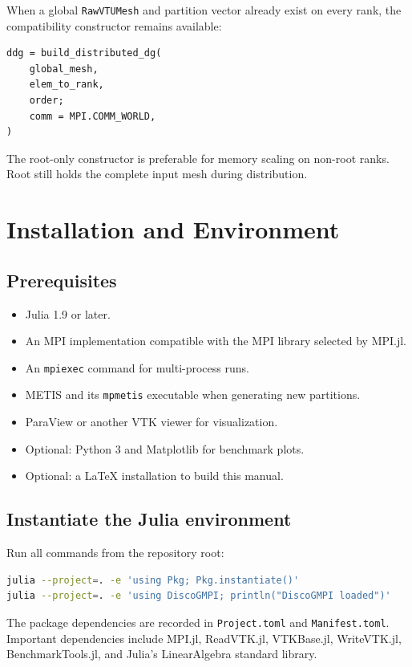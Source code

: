 \documentclass[11pt,oneside]{book}
\newcommand{\code}[1]{\texttt{#1}}
\begin{document}
When a global \code{RawVTUMesh} and partition vector already exist on every
rank, the compatibility constructor remains available:

\begin{lstlisting}
ddg = build_distributed_dg(
    global_mesh,
    elem_to_rank,
    order;
    comm = MPI.COMM_WORLD,
)
\end{lstlisting}

The root-only constructor is preferable for memory scaling on non-root ranks.
Root still holds the complete input mesh during distribution.

\chapter{Installation and Environment}

\section{Prerequisites}

\begin{itemize}[leftmargin=*]
  \item Julia 1.9 or later.
  \item An MPI implementation compatible with the MPI library selected by
        MPI.jl.
  \item An \code{mpiexec} command for multi-process runs.
  \item METIS and its \code{mpmetis} executable when generating new
        partitions.
  \item ParaView or another VTK viewer for visualization.
  \item Optional: Python 3 and Matplotlib for benchmark plots.
  \item Optional: a LaTeX installation to build this manual.
\end{itemize}

\section{Instantiate the Julia environment}

Run all commands from the repository root:

\begin{lstlisting}[language=bash]
julia --project=. -e 'using Pkg; Pkg.instantiate()'
julia --project=. -e 'using DiscoGMPI; println("DiscoGMPI loaded")'
\end{lstlisting}

The package dependencies are recorded in \code{Project.toml} and
\code{Manifest.toml}. Important dependencies include MPI.jl, ReadVTK.jl,
VTKBase.jl, WriteVTK.jl, BenchmarkTools.jl, and Julia's LinearAlgebra standard
library.
\end{document}
